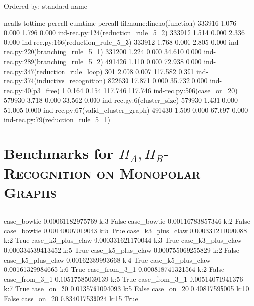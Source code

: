 \documentclass[11pt]{article}
\begin{document}
                      Ordered by: standard name

                      ncalls  tottime  percall  cumtime  percall filename:lineno(function)
                      333916    1.076    0.000    1.796    0.000 ind-rec.py:124(reduction_rule_5_2)
                      333912    1.514    0.000    2.336    0.000 ind-rec.py:166(reduction_rule_5_3)
                      333912    1.768    0.000    2.805    0.000 ind-rec.py:220(branching_rule_5_1)
                      331200    1.224    0.000   34.610    0.000 ind-rec.py:289(branching_rule_5_2)
                      491426    1.110    0.000   72.938    0.000 ind-rec.py:347(reduction_rule_loop)
                         301    2.008    0.007  117.582    0.391 ind-rec.py:374(inductive_recognition)
                      822630   17.871    0.000   35.732    0.000 ind-rec.py:40(p3_free)
                           1    0.164    0.164  117.746  117.746 ind-rec.py:506(case_on_20)
                      579930    3.718    0.000   33.562    0.000 ind-rec.py:6(cluster_size)
                      579930    1.431    0.000   51.005    0.000 ind-rec.py:67(valid_cluster_graph)
                      491430    1.509    0.000   67.697    0.000 ind-rec.py:79(reduction_rule_5_1)

\section{Benchmarks for \textsc{\textsc{$\Pi_A,$$\Pi_B$-Recognition} on Monopolar Graphs}}
\label{subsec:structural} %

\subsection{}
\label{subsec:results} %

case_bowtie 0.00061182975769 k:3 False
case_bowtie 0.00116783857346 k:2 False
case_bowtie 0.00140007019043 k:5 True
case_k3_plus_claw 0.000331211090088 k:2 True
case_k3_plus_claw 0.000331621170044 k:3 True
case_k3_plus_claw 0.000334539413452 k:5 True
case_k5_plus_claw 0.000755069255829 k:2 False
case_k5_plus_claw 0.00162389993668 k:4 True
case_k5_plus_claw 0.00161329984665 k:6 True
case_from_3_1 0.000818741321564 k:2 False
case_from_3_1 0.00517585039139 k:5 True
case_from_3_1 0.00514071941376 k:7 True
case_on_20 0.0135761094093 k:5 False
case_on_20 0.40817595005 k:10 False
case_on_20 0.834017539024 k:15 True

\subsection{}
\label{subsec:results} %
\end{document}
